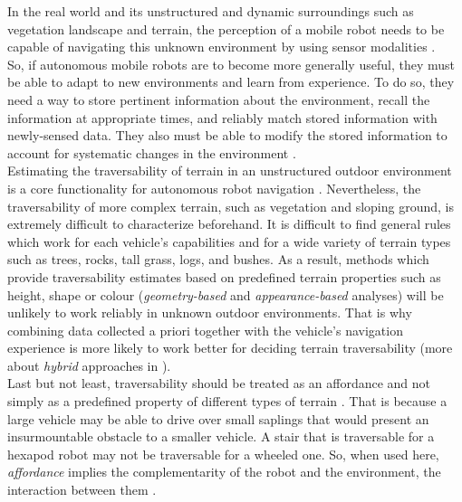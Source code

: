 \documentclass[12pt,a4paper,table,dvipsnames,tikz]{report}
\newcommand{\term}{\textit}
\begin{document}
	In the real world and its unstructured and dynamic surroundings such as vegetation 
	landscape and terrain, the perception of a mobile robot needs to be capable of 
	navigating this unknown environment by using sensor modalities \citep{Shabbir}.
	\\
	
	So, if autonomous mobile robots are to become more generally useful, they must 
	be able to adapt to new environments and learn from experience. To do so, they 
	need a way to store pertinent information about the environment, recall the 
	information at appropriate times, and reliably match stored information with 
	newly-sensed data. They also must be able to modify the stored information to 
	account for systematic changes in the environment \citep{Shneier}.
	\\
	
	Estimating the traversability of terrain in an unstructured outdoor 
	environment is a core functionality for autonomous robot navigation \citep{Kim}. 
	Nevertheless, the traversability of more complex terrain, such as 
	vegetation and sloping ground, is extremely difficult to characterize beforehand. 
	It is difficult to find general rules which work for each vehicle's	capabilities
	and for a wide variety of terrain types such as trees, rocks, tall grass, logs, 
	and bushes. As a result, methods which provide traversability estimates 
	based on predefined terrain properties such as height, shape or colour 
	(\term{geometry-based} and \term{appearance-based} analyses) will be unlikely to 
	work reliably in unknown outdoor environments. That is why combining data 
	collected a priori together with the vehicle’s navigation experience is more 
	likely to work better for deciding terrain traversability (more about 
	\term{hybrid} approaches in \citet{Papadakis}).
	\\
	
	Last but not least, traversability should be treated as an affordance and 
	not simply as a predefined property of different types of terrain \citep{Kim}. 
	That is because a large vehicle may be able to drive over small saplings that 
	would present an insurmountable obstacle to a smaller vehicle. A stair that is 
	traversable for a hexapod robot may not be traversable for a wheeled one. So, 
	when used here, \term{affordance} implies the complementarity of the robot and 
	the environment, the interaction between them \citep{Ugur}.
	\\
	
\end{document}

